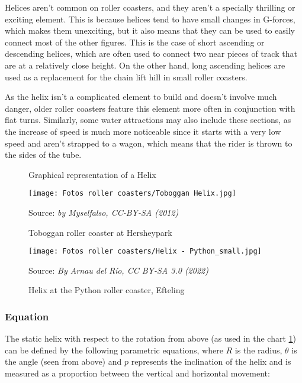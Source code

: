 \documentclass[12pt,twoside,a4paper]{article}
\newcommand{\source}[1]{\caption*{Source: \textit{#1}} }
\begin{document}
	Helices aren’t common on roller coasters, and they aren’t a specially thrilling or exciting element. This is because helices tend to have small changes in G-forces, which makes them unexciting, but it also means that they can be used to easily connect most of the other figures. This is the case of short ascending or descending helices, which are often used to connect two near pieces of track that are at a relatively close height. On the other hand, long ascending helices are used as a replacement for the chain lift hill in small roller coasters.
	
	As the helix isn't a complicated element to build and doesn't involve much danger, older roller coasters feature this element more often in conjunction with flat turns. Similarly, some water attractions may also include these sections, as the increase of speed is much more noticeable since it starts with a very low speed and aren't strapped to a wagon, which means that the rider is thrown to the sides of the tube.
	
	\begin{figure}[H]
		\centering
		\caption{Graphical representation of a Helix}
		\label{graph:Helix}
	\end{figure}
	
	\begin{figure}[H]
		\centering
		\texttt{[image: Fotos roller coasters/Toboggan Helix.jpg]}
		\caption{Toboggan roller coaster at Hersheypark}
		\label{fig:Toboggan Helix}
		\source{by Myselfalso, CC-BY-SA (2012)}
	\end{figure}

	\begin{figure}[H]
	\centering
	\texttt{[image: Fotos roller coasters/Helix - Python\_small.jpg]}
	\caption{Helix at the Python roller coaster, Efteling}
	\label{fig:Python Helix Roller Coaster}
	\source{By Arnau del Río, CC BY-SA 3.0 (2022)}
	\end{figure}
	
	\subsubsection{Equation}
	The static helix with respect to the rotation from above (as used in the chart \ref{graph:Helix}) can be defined by the following parametric equations, where $R$ is the radius, $\theta$ is the angle (seen from above) and $p$ represents the inclination of the helix and is measured as a proportion between the vertical and horizontal movement:
	
\end{document}
